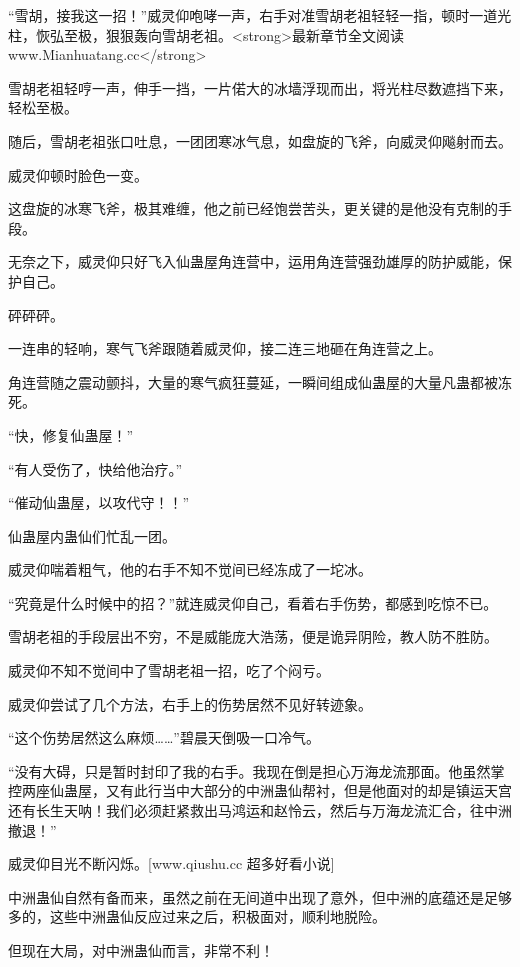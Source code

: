 
\begin{this_body}

“雪胡，接我这一招！”威灵仰咆哮一声，右手对准雪胡老祖轻轻一指，顿时一道光柱，恢弘至极，狠狠轰向雪胡老祖。<strong>最新章节全文阅读www.Mianhuatang.cc</strong>

雪胡老祖轻哼一声，伸手一挡，一片偌大的冰墙浮现而出，将光柱尽数遮挡下来，轻松至极。

随后，雪胡老祖张口吐息，一团团寒冰气息，如盘旋的飞斧，向威灵仰飚射而去。

威灵仰顿时脸色一变。

这盘旋的冰寒飞斧，极其难缠，他之前已经饱尝苦头，更关键的是他没有克制的手段。

无奈之下，威灵仰只好飞入仙蛊屋角连营中，运用角连营强劲雄厚的防护威能，保护自己。

砰砰砰。

一连串的轻响，寒气飞斧跟随着威灵仰，接二连三地砸在角连营之上。

角连营随之震动颤抖，大量的寒气疯狂蔓延，一瞬间组成仙蛊屋的大量凡蛊都被冻死。

“快，修复仙蛊屋！”

“有人受伤了，快给他治疗。”

“催动仙蛊屋，以攻代守！！”

仙蛊屋内蛊仙们忙乱一团。

威灵仰喘着粗气，他的右手不知不觉间已经冻成了一坨冰。

“究竟是什么时候中的招？”就连威灵仰自己，看着右手伤势，都感到吃惊不已。

雪胡老祖的手段层出不穷，不是威能庞大浩荡，便是诡异阴险，教人防不胜防。

威灵仰不知不觉间中了雪胡老祖一招，吃了个闷亏。

威灵仰尝试了几个方法，右手上的伤势居然不见好转迹象。

“这个伤势居然这么麻烦……”碧晨天倒吸一口冷气。

“没有大碍，只是暂时封印了我的右手。我现在倒是担心万海龙流那面。他虽然掌控两座仙蛊屋，又有此行当中大部分的中洲蛊仙帮衬，但是他面对的却是镇运天宫还有长生天呐！我们必须赶紧救出马鸿运和赵怜云，然后与万海龙流汇合，往中洲撤退！”

威灵仰目光不断闪烁。[www.qiushu.cc 超多好看小说]

中洲蛊仙自然有备而来，虽然之前在无间道中出现了意外，但中洲的底蕴还是足够多的，这些中洲蛊仙反应过来之后，积极面对，顺利地脱险。

但现在大局，对中洲蛊仙而言，非常不利！


\end{this_body}
